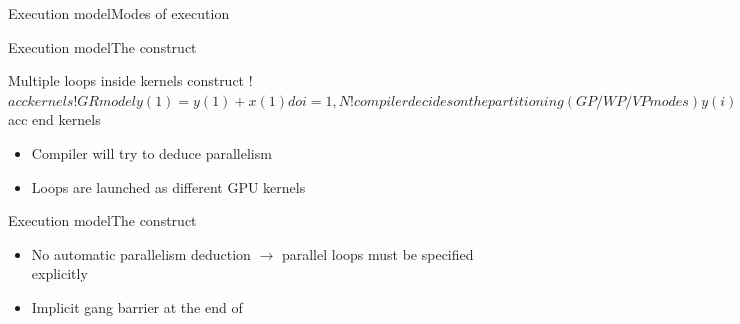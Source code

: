 \documentclass[12pt,aspectratio=169]{beamer}
\begin{document}
\begin{frame}{Execution model}{Modes of execution}
\begin{figure}
{    }
  \end{figure}
\end{frame}


\begin{frame}[fragile]{Execution model}{The  construct}
  \begin{Fortranlisting}{Multiple loops inside kernels construct}
!$acc kernels
    !GR model
    y(1) = y(1) + x(1)
    do i = 1, N
        !compiler decides on the partitioning (GP/WP/VP modes)
        y(i) = y(i) + a*x(i)
    enddo
    do i = 1, N
        !compiler decides on the partitioning (GP/WP/VP modes)
        y(i) = b*y(i) + a*x(i)
    enddo
!$acc end kernels
  \end{Fortranlisting}
  \begin{itemize}
  \item Compiler will try to deduce parallelism
  \item Loops are launched as different GPU kernels
  \end{itemize}
\end{frame}

\begin{frame}[fragile]{Execution model}{The  construct}
  \begin{itemize}
  \item No automatic parallelism deduction $\rightarrow$ parallel loops must
    be specified explicitly
  \item Implicit gang barrier at the end of 
  \end{itemize}
\end{frame}
\end{document}
